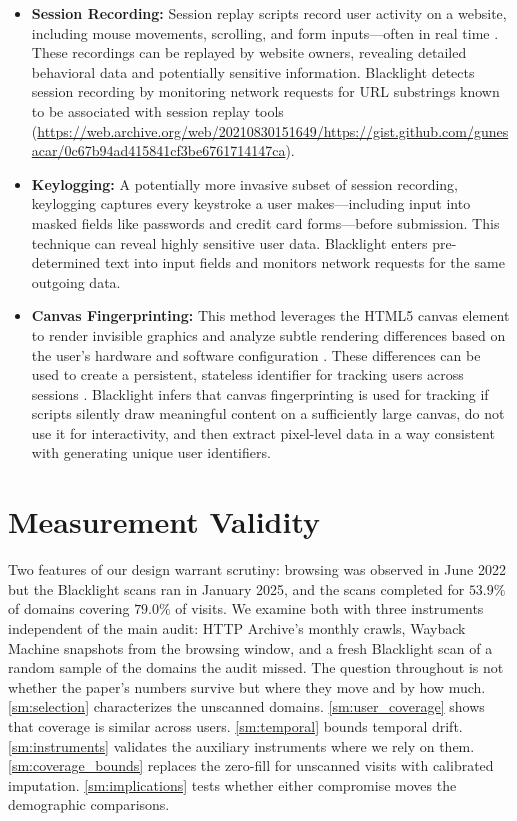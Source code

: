 \documentclass[12pt, letterpaper]{article}
\begin{document}
\begin{itemize}
    \item{
        \textbf{Session Recording:} 
        Session replay scripts record user activity on a website, including mouse movements, scrolling, and form inputs---often in real time \citep{leakyforms}.
        These recordings can be replayed by website owners, revealing detailed behavioral data and potentially sensitive information.
        Blacklight detects session recording by monitoring network requests for URL substrings known to be associated with session replay tools (\url{https://web.archive.org/web/20210830151649/https://gist.github.com/gunesacar/0c67b94ad415841cf3be6761714147ca}).
    }
    \item{
        \textbf{Keylogging:} A potentially more invasive subset of session recording, keylogging captures every keystroke a user makes---including input into masked fields like passwords and credit card forms---before submission.
        This technique can reveal highly sensitive user data.
        Blacklight enters pre-determined text into input fields and monitors network requests for the same outgoing data.
    }
    \item{
        \textbf{Canvas Fingerprinting:}
        This method leverages the HTML5 canvas element to render invisible graphics and analyze subtle rendering differences based on the user's hardware and software configuration \citep{Acar2014, MS12}.
        These differences can be used to create a persistent, stateless identifier for tracking users across sessions \citep{karaj2018whotracks, blacklight, pugliese2020long}.
        Blacklight infers that canvas fingerprinting is used for tracking if scripts silently draw meaningful content on a sufficiently large canvas, do not use it for interactivity, and then extract pixel-level data in a way consistent with generating unique user identifiers.
    }
\end{itemize}

\clearpage
\FloatBarrier
\section{Measurement Validity}
\label{sm:validity}


Two features of our design warrant scrutiny: browsing was observed in June 2022 but the Blacklight scans ran in January 2025, and the scans completed for $53.9\%$ of domains covering $79.0\%$ of visits. We examine both with three instruments independent of the main audit: HTTP Archive's monthly crawls, Wayback Machine snapshots from the browsing window, and a fresh Blacklight scan of a random sample of the domains the audit missed. The question throughout is not whether the paper's numbers survive but where they move and by how much. \cref{sm:selection} characterizes the unscanned domains. \cref{sm:user_coverage} shows that coverage is similar across users. \cref{sm:temporal} bounds temporal drift. \cref{sm:instruments} validates the auxiliary instruments where we rely on them. \cref{sm:coverage_bounds} replaces the zero-fill for unscanned visits with calibrated imputation. \cref{sm:implications} tests whether either compromise moves the demographic comparisons.
 
\end{document}
